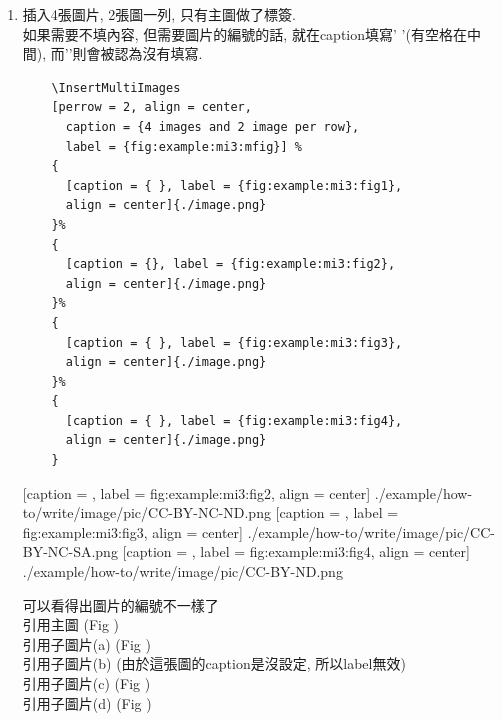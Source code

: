 \begin{enumerate}
{    e.g: 
    引用主圖 (Fig ) ,
    引用子圖片 (Fig , Fig ).
  } %

  \newpage
  \item
  {
    插入4張圖片, 2張圖一列, 只有主圖做了標簽.\\
    如果需要不填內容, 但需要圖片的編號的話, 就在caption填寫'{ }'(有空格在中間), 而'{}'則會被認為沒有填寫.
    \begin{verbatim}
    \InsertMultiImages
    [perrow = 2, align = center,
      caption = {4 images and 2 image per row},
      label = {fig:example:mi3:mfig}] %
    {
      [caption = { }, label = {fig:example:mi3:fig1},
      align = center]{./image.png}
    }%
    {
      [caption = {}, label = {fig:example:mi3:fig2},
      align = center]{./image.png}
    }%
    {
      [caption = { }, label = {fig:example:mi3:fig3},
      align = center]{./image.png}
    }%
    {
      [caption = { }, label = {fig:example:mi3:fig4},
      align = center]{./image.png}
    }
    \end{verbatim}

    {
      [caption = {},
      label = {fig:example:mi3:fig2},
      align = center]
      {./example/how-to/write/image/pic/CC-BY-NC-ND.png}
    }%
    {
      [caption = { },
      label = {fig:example:mi3:fig3},
      align = center]
      {./example/how-to/write/image/pic/CC-BY-NC-SA.png}
    }%
    {
      [caption = { },
      label = {fig:example:mi3:fig4},
      align = center]
      {./example/how-to/write/image/pic/CC-BY-ND.png}
    }

    可以看得出圖片的編號不一樣了\\
    引用主圖 (Fig )\\
    引用子圖片(a) (Fig )\\
    引用子圖片(b) (由於這張圖的caption是沒設定, 所以label無效)\\
    引用子圖片(c) (Fig )\\
    引用子圖片(d) (Fig )
  } %


\end{enumerate}
